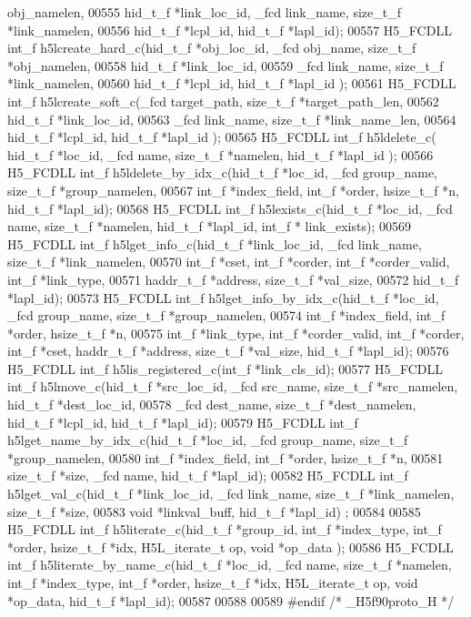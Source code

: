 \begin{DoxyCode}
      obj\_namelen,
00555                      hid\_t\_f *link\_loc\_id, \_fcd link\_name, size\_t\_f *link\_namelen,
00556                      hid\_t\_f *lcpl\_id, hid\_t\_f *lapl\_id);
00557 H5\_FCDLL int\_f h5lcreate\_hard\_c(hid\_t\_f *obj\_loc\_id, \_fcd obj\_name, size\_t\_f *obj\_namelen,
00558                  hid\_t\_f *link\_loc\_id,
00559                  \_fcd link\_name, size\_t\_f *link\_namelen,
00560                  hid\_t\_f *lcpl\_id, hid\_t\_f *lapl\_id );
00561 H5\_FCDLL int\_f h5lcreate\_soft\_c(\_fcd target\_path, size\_t\_f *target\_path\_len,
00562                  hid\_t\_f *link\_loc\_id,
00563                  \_fcd link\_name, size\_t\_f *link\_name\_len,
00564                  hid\_t\_f *lcpl\_id, hid\_t\_f *lapl\_id );
00565 H5\_FCDLL int\_f h5ldelete\_c( hid\_t\_f *loc\_id, \_fcd name, size\_t\_f *namelen, hid\_t\_f *lapl\_id );
00566 H5\_FCDLL int\_f h5ldelete\_by\_idx\_c(hid\_t\_f *loc\_id, \_fcd group\_name, size\_t\_f *group\_namelen,
00567                     int\_f *index\_field, int\_f *order, hsize\_t\_f *n, hid\_t\_f *lapl\_id);
00568 H5\_FCDLL int\_f h5lexists\_c(hid\_t\_f *loc\_id, \_fcd name, size\_t\_f *namelen, hid\_t\_f *lapl\_id, int\_f *
      link\_exists);
00569 H5\_FCDLL int\_f h5lget\_info\_c(hid\_t\_f *link\_loc\_id, \_fcd link\_name, size\_t\_f *link\_namelen,
00570                    int\_f *cset, int\_f *corder, int\_f *corder\_valid, int\_f *link\_type,
00571                    haddr\_t\_f *address, size\_t\_f *val\_size,
00572                    hid\_t\_f *lapl\_id);
00573 H5\_FCDLL int\_f h5lget\_info\_by\_idx\_c(hid\_t\_f *loc\_id, \_fcd group\_name, size\_t\_f *group\_namelen,
00574               int\_f *index\_field, int\_f *order, hsize\_t\_f *n,
00575               int\_f *link\_type, int\_f *corder\_valid, int\_f *corder, int\_f *cset, haddr\_t\_f *address, 
      size\_t\_f *val\_size, hid\_t\_f *lapl\_id);
00576 H5\_FCDLL int\_f h5lis\_registered\_c(int\_f *link\_cls\_id);
00577 H5\_FCDLL int\_f h5lmove\_c(hid\_t\_f *src\_loc\_id, \_fcd src\_name, size\_t\_f *src\_namelen, hid\_t\_f *dest\_loc\_id,
00578               \_fcd dest\_name, size\_t\_f *dest\_namelen, hid\_t\_f *lcpl\_id, hid\_t\_f *lapl\_id);
00579 H5\_FCDLL int\_f h5lget\_name\_by\_idx\_c(hid\_t\_f *loc\_id, \_fcd group\_name, size\_t\_f *group\_namelen,
00580                      int\_f *index\_field, int\_f *order, hsize\_t\_f *n,
00581                      size\_t\_f *size, \_fcd name, hid\_t\_f *lapl\_id);
00582 H5\_FCDLL int\_f h5lget\_val\_c(hid\_t\_f *link\_loc\_id, \_fcd link\_name, size\_t\_f *link\_namelen, size\_t\_f *size,
00583                  \textcolor{keywordtype}{void} *linkval\_buff, hid\_t\_f *lapl\_id) ;
00584 
00585 H5\_FCDLL int\_f h5literate\_c(hid\_t\_f *group\_id, int\_f *index\_type, int\_f *order, hsize\_t\_f *idx, 
      H5L\_iterate\_t op, \textcolor{keywordtype}{void} *op\_data );
00586 H5\_FCDLL int\_f h5literate\_by\_name\_c(hid\_t\_f *loc\_id, \_fcd name, size\_t\_f *namelen, int\_f *index\_type, int\_f
       *order, hsize\_t\_f *idx, H5L\_iterate\_t op, \textcolor{keywordtype}{void} *op\_data, hid\_t\_f *lapl\_id);
00587 
00588 
00589 \textcolor{preprocessor}{#endif }\textcolor{comment}{/* \_H5f90proto\_H */}\textcolor{preprocessor}{}
\end{DoxyCode}
